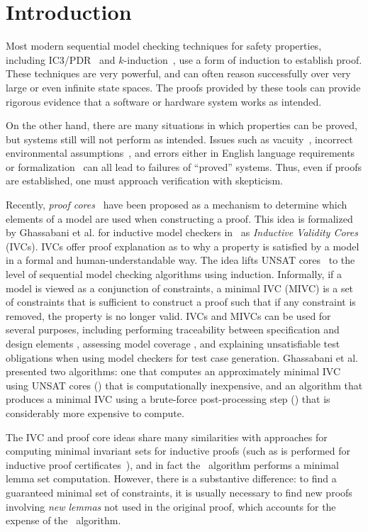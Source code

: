 \section{Introduction}
\label{sec:intro}
Most modern sequential model checking techniques for safety properties, including IC3/PDR~\cite{Een2011:PDR} and $k$-induction~\cite{SheeranSS00}, use a form of induction to establish proof.  These techniques are very powerful, and can often reason successfully over very large or even infinite state spaces.  The proofs provided by these tools can provide rigorous evidence that a software or hardware system works as intended.

On the other hand, there are many situations in which properties can be proved, but systems still will not perform as intended.  Issues such as vacuity~\cite{Kupferman03:Vacuity}, incorrect environmental assumptions~\cite{Whalen07:FMICS}, and errors either in English language requirements or formalization~\cite{Pike06:axioms} can all lead to failures of ``proved'' systems.  Thus, even if proofs are established, one must approach verification with skepticism.

Recently, {\em proof cores}~\cite{jasper_gold} have been proposed as a mechanism to determine which elements of a model are used when constructing a proof.  This idea is formalized by Ghassabani et al. for inductive model checkers in~\cite{Ghass16} as {\em Inductive Validity Cores} (IVCs). IVCs offer proof explanation as to why a property is satisfied by a model in a formal and human-understandable way.  The idea lifts UNSAT cores~\cite{zhang2003extracting}
to the level of sequential model checking algorithms using induction.  Informally, if a model is viewed as a conjunction of constraints,
a minimal IVC (MIVC) is a set of constraints that is sufficient to construct a proof such that if any constraint is removed, the property is no longer valid.
%
IVCs and MIVCs can be used for several purposes, including performing traceability between specification and design elements \cite{Murugesan16:renext}, assessing model coverage \cite{Ghass17Cov}, and explaining unsatisfiable test obligations when using model checkers for test case generation. Ghassabani et al.~\cite{Ghass16} presented two algorithms: one that computes an approximately minimal IVC using UNSAT cores (\ucalg) that is computationally inexpensive, and an algorithm that produces a
minimal IVC using a brute-force post-processing step (\ucbfalg) that is considerably more expensive to compute.

The IVC and proof core ideas share many similarities with approaches for computing minimal invariant sets for inductive proofs (such as is performed for inductive proof certificates~\cite{piskac2016, ivrii2014small}), and in fact the \ucalg\ algorithm performs a minimal lemma set computation.  However, there is a substantive difference: to find a guaranteed minimal set of constraints, it is usually necessary to find new proofs involving {\em new lemmas} not used in the original proof, which accounts for the expense of the \ucbfalg\ algorithm.


